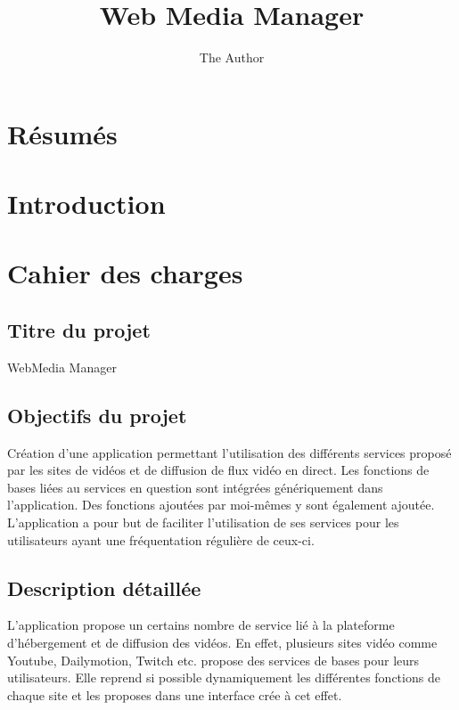 \documentclass[11pt]{report} %
\title{Web Media Manager}
\author{The Author}
\begin{document}
	
\maketitle
\newpage

\tableofcontents

\chapter{Résumés}

\chapter{Introduction}

\chapter{Cahier des charges}
	\section{Titre du projet}
	WebMedia Manager

	\section{Objectifs du projet}
	Création d’une application permettant l’utilisation des différents services proposé par les sites de vidéos et de diffusion de flux vidéo en direct.
	Les fonctions de bases liées au services en question sont intégrées génériquement dans l’application.
	Des fonctions ajoutées par moi-mêmes y sont également ajoutée.
	L’application a pour but de faciliter l’utilisation de ses services pour les utilisateurs ayant une fréquentation régulière de ceux-ci.

	\section{Description détaillée}
	L’application propose un certains nombre de service lié à la plateforme d’hébergement et de diffusion des vidéos. En effet, plusieurs sites vidéo comme Youtube, Dailymotion, Twitch etc. propose des services de bases pour leurs utilisateurs.
	Elle reprend si possible dynamiquement les différentes fonctions de chaque site et les proposes dans une interface crée à cet effet.
\end{document}
